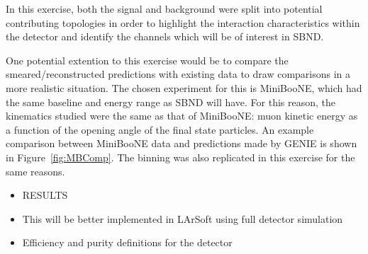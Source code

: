 In this exercise, both the signal and background were split into potential contributing topologies in order to highlight the interaction characteristics within the detector and identify the channels which will be of interest in SBND. 
   
One potential extention to this exercise would be to compare the smeared/reconstructed predictions with existing data to draw comparisons in a more realistic situation. The chosen experiment for this is MiniBooNE, which had the same baseline and energy range as SBND will have. For this reason, the kinematics studied were the same as that of MiniBooNE: muon kinetic energy as a function of the opening angle of the final state particles. An example comparison between
MiniBooNE data and predictions made by GENIE is shown in Figure~\ref{fig:MBComp}. The binning was also replicated in this exercise for the same reasons.


    \begin{itemize}
        \item RESULTS
        \item This will be better implemented in LArSoft using full detector simulation
        \item Efficiency and purity definitions for the detector
    \end{itemize}


\clearpage
